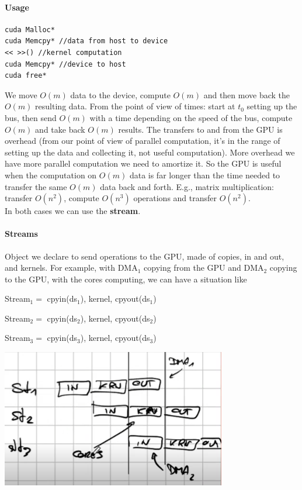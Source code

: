 \documentclass[10pt]{report}
\begin{document}
\paragraph{Usage}
\begin{lstlisting}[style=myC]
cuda Malloc*
cuda Memcpy* //data from host to device
<< >>() //kernel computation
cuda Memcpy* //device to host
cuda free*
\end{lstlisting}
We move $O(m)$ data to the device, compute $O(m)$ and then move back the $O(m)$ resulting data. From the point of view of times: start at $t_0$ setting up the bus, then send $O(m)$ with a time depending on the speed of the bus, compute $O(m)$ and take back $O(m)$ results. The transfers to and from the GPU is overhead (from our point of view of parallel computation, it's in the range of setting up the data and collecting it, not useful computation). More overhead we have more parallel computation we need to amortize it. So the GPU is useful when the computation on $O(m)$ data is far longer than the time needed to transfer the same $O(m)$ data back and forth. E.g., matrix multiplication: transfer $O(n^2)$, compute $O(n^3)$ operations and transfer $O(n^2)$.\\
In both cases we can use the \textbf{stream}.
\paragraph{Streams} Object we declare to send operations to the GPU, made of copies, in and out, and kernels. For example, with DMA$_1$ copying from the GPU and DMA$_2$ copying to the GPU, with the cores computing, we can have a situation like
\begin{multicols}{2}
\begin{list}{}{}
	\item Stream$_1 = $ cpyin(ds$_1$), kernel, cpyout(ds$_1$)
	\item Stream$_2 = $ cpyin(ds$_2$), kernel, cpyout(ds$_2$)
	\item Stream$_3 = $ cpyin(ds$_3$), kernel, cpyout(ds$_3$)
\end{list}
\begin{center}
	\includegraphics[scale=0.5]{24.png}
\end{center}
\end{multicols}
\pagebreak
\end{document}
